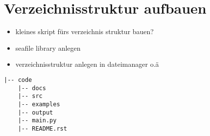 \hypertarget{verzeichnisstruktur-aufbauen}{%
\section{Verzeichnisstruktur
aufbauen}\label{verzeichnisstruktur-aufbauen}}

\begin{itemize}
\item
  kleines skript fürs verzeichnis struktur bauen?
\item
  seafile library anlegen
\item
  verzeichnisstruktur anlegen in dateimanager o.ä
\end{itemize}

\begin{verbatim}
|-- code
    |-- docs
    |-- src
    |-- examples
    |-- output
    |-- main.py
    |-- README.rst
\end{verbatim}

